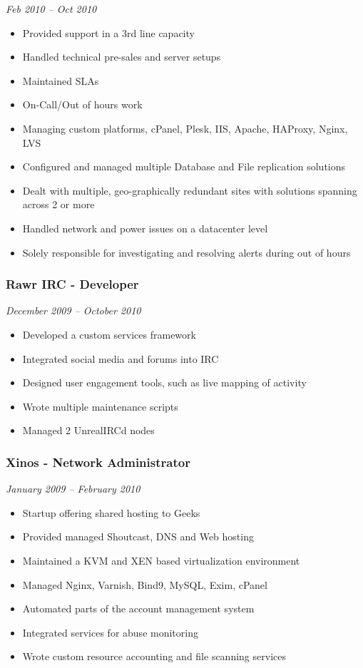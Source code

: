 \emph{Feb 2010 -- Oct 2010}

\begin{itemize}
\item
  Provided support in a 3rd line capacity
\item
  Handled technical pre-sales and server setups
\item
  Maintained SLAs
\item
  On-Call/Out of hours work
\item
  Managing custom platforms, cPanel, Plesk, IIS, Apache, HAProxy, Nginx,
  LVS
\item
  Configured and managed multiple Database and File replication
  solutions
\item
  Dealt with multiple, geo-graphically redundant sites with solutions
  spanning across 2 or more
\item
  Handled network and power issues on a datacenter level
\item
  Solely responsible for investigating and resolving alerts during out
  of hours
\end{itemize}

\subsubsection{Rawr IRC - Developer}

\emph{December 2009 -- October 2010}

\begin{itemize}
\item
  Developed a custom services framework
\item
  Integrated social media and forums into IRC
\item
  Designed user engagement tools, such as live mapping of activity
\item
  Wrote multiple maintenance scripts
\item
  Managed 2 UnrealIRCd nodes
\end{itemize}

\subsubsection{Xinos - Network Administrator}

\emph{January 2009 -- February 2010}

\begin{itemize}
\item
  Startup offering shared hosting to Geeks
\item
  Provided managed Shoutcast, DNS and Web hosting
\item
  Maintained a KVM and XEN based virtualization environment
\item
  Managed Nginx, Varnish, Bind9, MySQL, Exim, cPanel
\item
  Automated parts of the account management system
\item
  Integrated services for abuse monitoring
\item
  Wrote custom resource accounting and file scanning services
\end{itemize}

